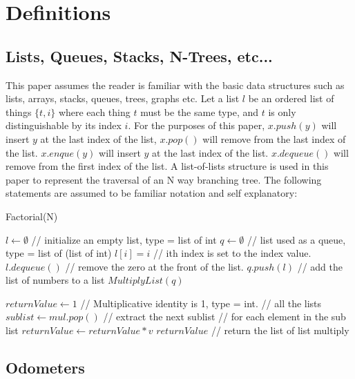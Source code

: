 \chapter{Definitions}

\section{Lists, Queues, Stacks, N-Trees, etc...}
This paper assumes the reader is familiar with the basic data structures such as lists, arrays, stacks, queues, trees, graphs etc. Let a list $l$ be an ordered list of things $\{t,i\}$ where each thing $t$ must be the same type, and $t$ is only distinguishable by its index $i$. For the purposes of this paper, $x.push(y)$ will insert $y$ at the last index of the list, $x.pop()$ will remove from the last index of the list.  $x.enque(y)$ will insert $y$ at the last index of the list. $x.dequeue()$ will remove from the first index of the list. A list-of-lists structure is used in this paper to represent the traversal of an N way branching tree. The following statements are assumed to be familiar notation and self explanatory:

\begin{algorithm}
	\caption{Factorial(N)}\label{factorial}
	\begin{algorithmic}[1]
		\State $l \gets \emptyset$ // initialize an empty list, type = list of int
		\State $q \gets \emptyset$ // list used as a queue, type = list of (list of int)
		\State $l[i] = i$ // ith index is set to the index value.
		\EndFor
		\State $l.dequeue()$  // remove the zero at the front of the list. 
		\State $q.push(l)$ // add the list of numbers to a list
		\State \Return $MultiplyList(q)$ 
		\EndFunction
	\end{algorithmic}
	\begin{algorithmic}[1]
		\State $returnValue \gets 1$ // Multiplicative identity is 1, type = int.
		 // all the lists
		\State $sublist \gets mul.pop()$ // extract the next sublist
		  // for each element in the sub list
		\State $returnValue \gets returnValue * v$ 
		\EndFor
		\EndWhile
		\State \Return $returnValue$ // return the list of list multiply
		\EndFunction
	\end{algorithmic}
\end{algorithm}

\section{Odometers }

